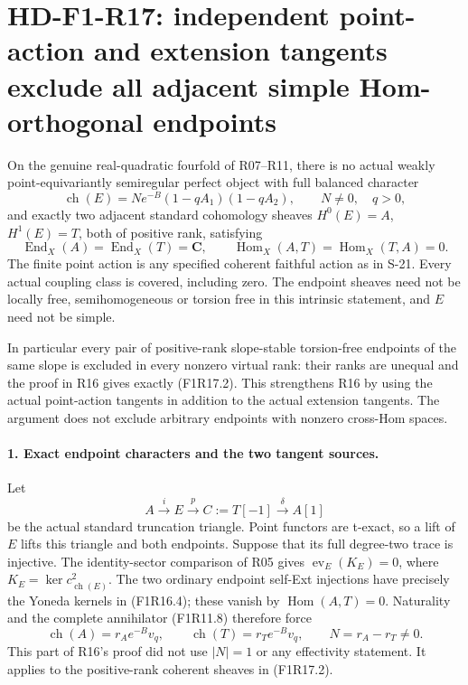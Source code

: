 \section[HD-F1-R17: adjacent Hom-orthogonal endpoints]{HD-F1-R17: independent point-action and extension tangents exclude all adjacent simple Hom-orthogonal endpoints}
\label{sec:followup-rm-adjacent-orbit-tangent}

On the genuine real-quadratic fourfold of R07--R11,
there is no actual weakly point-equivariantly semiregular
perfect object with full balanced character
\[
 \operatorname{ch}(E)=N e^{-B}(1-qA_1)(1-qA_2),
       \qquad N\ne0,\quad q>0,
 \tag{F1R17.1}
\]
and exactly two adjacent standard cohomology sheaves
$H^0(E)=A$, $H^1(E)=T$, both of positive rank, satisfying
\[
 \operatorname{End}_X(A)=\operatorname{End}_X(T)=\mathbf C,
       \qquad
 \operatorname{Hom}_X(A,T)=\operatorname{Hom}_X(T,A)=0.
 \tag{F1R17.2}
\]
The finite point action is any specified coherent faithful
action as in S-21. Every actual coupling class is covered,
including zero. The endpoint sheaves need not be locally
free, semihomogeneous or torsion free in this intrinsic
statement, and $E$ need not be simple.

In particular every pair of positive-rank slope-stable
torsion-free endpoints of the same slope is excluded in
every nonzero virtual rank: their ranks are unequal and
the proof in R16 gives exactly (F1R17.2). This strengthens
R16 by using the actual point-action tangents in addition
to the actual extension tangents. The argument does not
exclude arbitrary endpoints with nonzero cross-Hom spaces.

\paragraph{1. Exact endpoint characters and the two tangent sources.}
Let
\[
 A\xrightarrow{i}E\xrightarrow{p} C:=T[-1]
                 \xrightarrow{\delta}A[1]
 \tag{F1R17.3}
\]
be the actual standard truncation triangle. Point functors
are t-exact, so a lift of $E$ lifts this triangle and both
endpoints. Suppose that its full degree-two trace is
injective. The identity-sector comparison of R05 gives
$\operatorname{ev}_E(K_E)=0$, where
$K_E=\ker c^2_{\operatorname{ch}(E)}$. The two ordinary
endpoint self-Ext injections have precisely the Yoneda
kernels in (F1R16.4); these vanish by
$\operatorname{Hom}(A,T)=0$. Naturality and the complete
annihilator (F1R11.8) therefore force
\[
 \operatorname{ch}(A)=r_Ae^{-B}v_q,
       \qquad
 \operatorname{ch}(T)=r_Te^{-B}v_q,
       \qquad N=r_A-r_T\ne0.
 \tag{F1R17.4}
\]
This part of R16's proof did not use $|N|=1$ or any
effectivity statement. It applies to the positive-rank
coherent sheaves in (F1R17.2).

